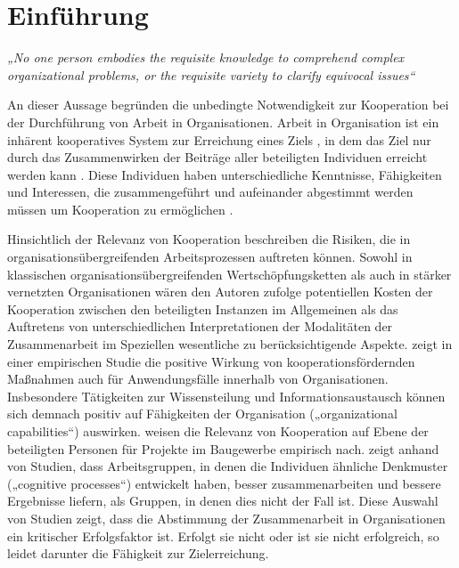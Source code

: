 \chapter{Einführung} %
\label{cha:einführung}

\emph{„No one person embodies the requisite knowledge to comprehend complex organizational problems, or the requisite variety to clarify equivocal issues“} \citep{Tyre97}

An dieser Aussage begründen \citeauthor{Tyre97} die unbedingte Notwendigkeit zur Kooperation bei der Durchführung von Arbeit in Organisationen. Arbeit in Organisation ist ein inhärent kooperatives System \citep{Helmberger62} zur Erreichung eines Ziels \citep{Semmer04}, in dem das Ziel nur durch das Zusammenwirken der Beiträge aller beteiligten Individuen erreicht werden kann \citep{Strauss85} \citep{Tyre97}. Diese Individuen haben unterschiedliche Kenntnisse, Fähigkeiten und Interessen, die zusammengeführt und aufeinander abgestimmt werden müssen um Kooperation zu ermöglichen \citep{Schmidt94}.

Hinsichtlich der Relevanz von Kooperation beschreiben \citet{Kumar96} die Risiken, die in organisationsübergreifenden Arbeitsprozessen auftreten können. Sowohl in klassischen organisationsübergreifenden Wertschöpfungsketten als auch in stärker vernetzten Organisationen wären den Autoren zufolge potentiellen Kosten der Kooperation zwischen den beteiligten Instanzen im Allgemeinen als das Auftretens von unterschiedlichen Interpretationen der Modalitäten der Zusammenarbeit im Speziellen wesentliche zu berücksichtigende Aspekte. \citet{Tsai02} zeigt in einer empirischen Studie die positive Wirkung von kooperationsfördernden Maßnahmen auch für Anwendungsfälle innerhalb von Organisationen. Insbesondere Tätigkeiten zur Wissensteilung und Informationsaustausch können sich demnach positiv auf Fähigkeiten der Organisation („organizational capabilities“) auswirken. \citet{Phua04} weisen die Relevanz von Kooperation auf Ebene der beteiligten Personen für Projekte im Baugewerbe empirisch nach. \citet{Roy01} zeigt anhand von Studien, dass Arbeitsgruppen, in denen die Individuen ähnliche Denkmuster („cognitive processes“) entwickelt haben, besser zusammenarbeiten und bessere Ergebnisse liefern, als Gruppen, in denen dies nicht der Fall ist. Diese Auswahl von Studien zeigt, dass die Abstimmung der Zusammenarbeit in Organisationen ein kritischer Erfolgsfaktor ist. Erfolgt sie nicht oder ist sie nicht erfolgreich, so leidet darunter die Fähigkeit zur Zielerreichung.

